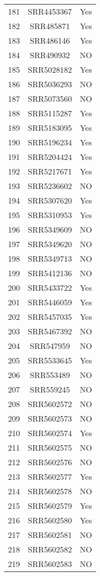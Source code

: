 \begin{longtable}{ccc}
  181 & SRR4453367 & Yes \\ 
  182 & SRR485871 & Yes \\ 
  183 & SRR486146 & Yes \\ 
  184 & SRR490932 & NO \\ 
  185 & SRR5028182 & Yes \\ 
  186 & SRR5036293 & NO \\ 
  187 & SRR5073560 & NO \\ 
  188 & SRR5115287 & Yes \\ 
  189 & SRR5183095 & Yes \\ 
  190 & SRR5196234 & Yes \\ 
  191 & SRR5204424 & Yes \\ 
  192 & SRR5217671 & Yes \\ 
  193 & SRR5236602 & NO \\ 
  194 & SRR5307620 & Yes \\ 
  195 & SRR5310953 & Yes \\ 
  196 & SRR5349609 & NO \\ 
  197 & SRR5349620 & NO \\ 
  198 & SRR5349713 & NO \\ 
  199 & SRR5412136 & NO \\ 
  200 & SRR5433722 & Yes \\ 
  201 & SRR5446059 & Yes \\ 
  202 & SRR5457035 & Yes \\ 
  203 & SRR5467392 & NO \\ 
  204 & SRR547959 & NO \\ 
  205 & SRR5533645 & Yes \\ 
  206 & SRR553489 & NO \\ 
  207 & SRR559245 & NO \\ 
  208 & SRR5602572 & NO \\ 
  209 & SRR5602573 & NO \\ 
  210 & SRR5602574 & Yes \\ 
  211 & SRR5602575 & NO \\ 
  212 & SRR5602576 & NO \\ 
  213 & SRR5602577 & Yes \\ 
  214 & SRR5602578 & NO \\ 
  215 & SRR5602579 & Yes \\ 
  216 & SRR5602580 & Yes \\ 
  217 & SRR5602581 & NO \\ 
  218 & SRR5602582 & NO \\ 
  219 & SRR5602583 & NO \\ 

\end{longtable}
